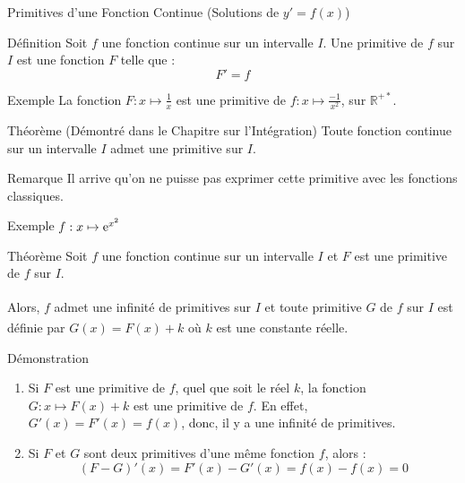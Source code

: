 \documentclass{coursbook}
\begin{document}
    \begin{Gpartie}{Primitives d'une Fonction Continue \big(Solutions de $y'=f(x)$\big)} 
        \vspace{-5ex}
        \begin{Spartie}{Définition} 
            Soit $f$ une fonction continue sur un intervalle $I$. Une primitive de $f$ sur $I$ est une fonction $F$ telle que :
            \[F'=f\]
        \end{Spartie}
        \vspace{-5ex}
        \begin{Spartie}{Exemple} 
            La fonction $F:x\mapsto\frac{1}{x}$ est une primitive de $f:x\mapsto\frac{-1}{x^2}$, sur $\mathbb{R^{+*}}$.
        \end{Spartie}
        \vspace{-3ex}
        \begin{Spartie}{Théorème (Démontré dans le Chapitre sur l'Intégration)} 
            Toute fonction continue sur un intervalle $I$ admet une primitive sur $I$.
        \end{Spartie}
        \vspace{-3ex}
        \begin{Spartie}{Remarque} 
            Il arrive qu'on ne puisse pas exprimer cette primitive avec les fonctions classiques.
            \begin{SSpartie}{Exemple} 
                $f:x\mapsto \mathrm{e}^{x^2}$
            \end{SSpartie}
        \end{Spartie}
        \vspace{-5ex}
        \begin{Spartie}{Théorème} 
            Soit $f$ une fonction continue sur un intervalle $I$ et $F$ est une primitive de $f$ sur $I$.

            Alors, $f$ admet une infinité de primitives sur $I$\textsuperscript{} et toute primitive $G$ de $f$ sur $I$ est définie par $G(x)=F(x)+k$\textsuperscript{} où $k$ est une constante réelle.

            \begin{SSpartie}{Démonstration} 
                \begin{enumerate}\vspace*{-2ex}
                    \item Si $F$ est une primitive de $f$, quel que soit le réel $k$, la fonction $G:x\mapsto F(x)+k$ est une primitive de $f$. En effet, $G'(x)=F'(x)=f(x)$, donc, il y a une infinité de primitives.
                    \item Si $F$ et $G$ sont deux primitives d'une même fonction $f$, alors :
                    \[(F-G)'(x)=F'(x)-G'(x)=f(x)-f(x)=0\]
    

\end{enumerate}
\end{SSpartie}
\end{Spartie}
\end{Gpartie}
\end{document}
